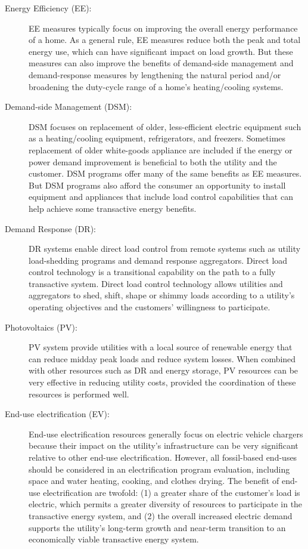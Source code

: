\begin{description}

    \item[Energy Efficiency (EE):] EE measures typically focus on improving the overall energy performance of a home.  As a general rule, EE measures reduce both the peak and total energy use, which can have significant impact on load growth. But these measures can also improve the benefits of demand-side management and demand-response measures by lengthening the natural period and/or broadening the duty-cycle range of a home's heating/cooling systems. 

    \item[Demand-side Management (DSM):] DSM focuses on replacement of older, less-efficient electric equipment such as a heating/cooling equipment, refrigerators, and freezers.  Sometimes replacement of older white-goods appliance are included if the energy or power demand improvement is beneficial to both the utility and the customer. DSM programs offer many of the same benefits as EE measures. But DSM programs also afford the consumer an opportunity to install equipment and appliances that include load control capabilities that can help achieve some transactive energy benefits.

    \item[Demand Response (DR):] DR systems enable direct load control from remote systems such as utility load-shedding programs and demand response aggregators.  Direct load control technology is a transitional capability on the path to a fully transactive system.  Direct load control technology allows utilities and aggregators to shed, shift, shape or shimmy loads according to a utility's operating objectives and the customers' willingness to participate.

    \item[Photovoltaics (PV):] PV system provide utilities with a local source of renewable energy that can reduce midday peak loads and reduce system losses.  When combined with other resources such as DR and energy storage, PV resources can be very effective in reducing utility costs, provided the coordination of these resources is performed well.

    \item[End-use electrification (EV):] End-use electrification resources generally focus on electric vehicle chargers because their impact on the utility's infrastructure can be very significant relative to other end-use electrification.  However, all fossil-based end-uses should be considered in an electrification program evaluation, including space and water heating, cooking, and clothes drying. The benefit of end-use electrification are twofold: (1) a greater share of the customer's load is electric, which permits a greater diversity of resources to participate in the transactive energy system, and (2) the overall increased electric demand supports the utility's long-term growth and near-term transition to an economically viable transactive energy system.


\end{description}
